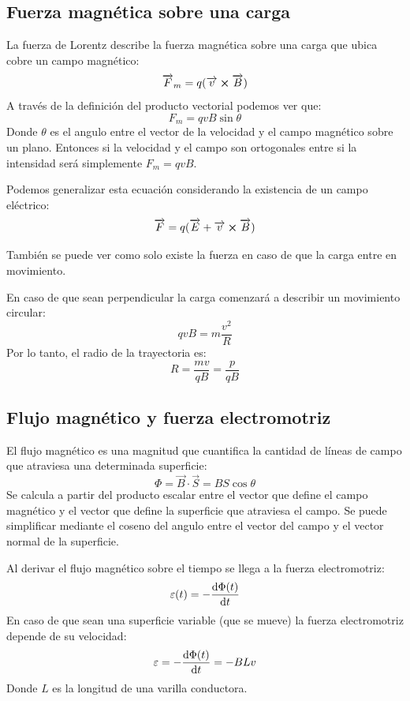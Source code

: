 \documentclass[arial,a4paper,print]{article}
\begin{document}
\subsection{Fuerza magnética sobre una carga}
La fuerza de Lorentz describe la fuerza magnética sobre una carga que ubica cobre un campo magnético:
\begin{equation*}
	\overrightarrow{F}_{m} = q(\overrightarrow{v}\cross\overrightarrow{B})
\end{equation*}
A través de la definición del producto vectorial podemos ver que:
\begin{equation*}
	F_{m} = qvB\sin\theta 
\end{equation*}
Donde $\theta$ es el angulo entre el vector de la velocidad y el campo magnético sobre un plano.
Entonces si la velocidad y el campo son ortogonales entre si la intensidad será simplemente $F_{m}=qvB$. 

Podemos generalizar esta ecuación considerando la existencia de un campo eléctrico:
\begin{equation*}
	\overrightarrow{F} = q(\overrightarrow{E} + \overrightarrow{v}\cross\overrightarrow{B})
\end{equation*}

También se puede ver como solo existe la fuerza en caso de que la carga entre en movimiento.

En caso de que sean perpendicular la carga comenzará a describir un movimiento circular:
\begin{equation*}
	qvB=m\frac{v^{2}}{R}
\end{equation*}
Por lo tanto, el radio de la trayectoria es:
\begin{equation*}
	R=\frac{mv}{qB} = \frac{p}{qB}
\end{equation*}

\subsection{Flujo magnético y fuerza electromotriz}

El flujo magnético es una magnitud que cuantifica la cantidad de líneas de campo que atraviesa una determinada superficie:
\begin{equation*}
	\Phi = \overrightarrow{B}\cdot\overrightarrow{S} = BS\cos\theta
\end{equation*}
Se calcula a partir del producto escalar entre el vector que define el campo magnético y el vector que define la superficie que atraviesa el campo. Se puede simplificar mediante el coseno del angulo entre el vector del campo y el vector normal de la superficie. 

Al derivar el flujo magnético sobre el tiempo se llega a la fuerza electromotriz:
\begin{equation*}
	\varepsilon(t) = -\dv{\Phi(t)}{t}
\end{equation*}
En caso de que sean una superficie variable (que se mueve) la fuerza electromotriz depende de su velocidad:
\begin{equation*}
	\varepsilon = -\dv{\Phi(t)}{t} = -BLv
\end{equation*}
Donde $L$ es la longitud de una varilla conductora. 
\end{document}
